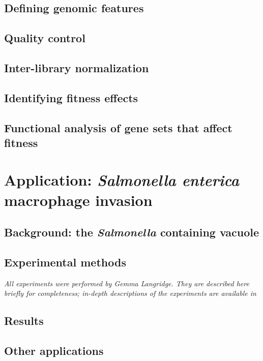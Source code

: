 \subsection{Defining genomic features}

\subsection{Quality control}

\subsection{Inter-library normalization}

\subsection{Identifying fitness effects}

\subsection{Functional analysis of gene sets that affect fitness}

\section{Application: \textit{Salmonella enterica} macrophage invasion}

\subsection{Background: the {\it Salmonella} containing vacuole}

\subsection{Experimental methods}

\textit{All experiments were performed by Gemma Langridge. They are described here briefly for completeness; in-depth descriptions of the experiments are available in \parencite{Langridge2010}}


\subsection{Results}

\subsection{Other applications}
